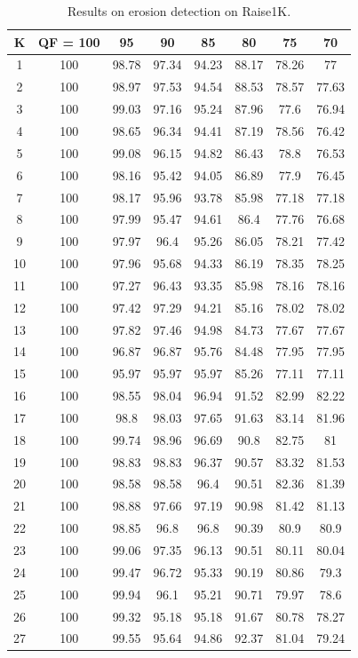\documentclass[review]{elsarticle}
\begin{document}
		
	\begin{longtable}{c|ccccccc}
		\caption{Results on erosion detection on Raise1K.}
		\label{table:raise}\\
		\hline\hline
		\textbf{K}&\textbf{QF = 100}&\textbf{95}&\textbf{90}&\textbf{85}&\textbf{80}&\textbf{75}&\textbf{70}\\
		\hline
		1&100&98.78&97.34&94.23&88.17&78.26&77\\
		2&100&98.97&97.53&94.54&88.53&78.57&77.63\\
		3&100&99.03&97.16&95.24&87.96&77.6&76.94\\
		4&100&98.65&96.34&94.41&87.19&78.56&76.42\\
		5&100&99.08&96.15&94.82&86.43&78.8&76.53\\
		6&100&98.16&95.42&94.05&86.89&77.9&76.45\\
		7&100&98.17&95.96&93.78&85.98&77.18&77.18\\
		8&100&97.99&95.47&94.61&86.4&77.76&76.68\\
		9&100&97.97&96.4&95.26&86.05&78.21&77.42\\
		10&100&97.96&95.68&94.33&86.19&78.35&78.25\\
		11&100&97.27&96.43&93.35&85.98&78.16&78.16\\
		12&100&97.42&97.29&94.21&85.16&78.02&78.02\\
		13&100&97.82&97.46&94.98&84.73&77.67&77.67\\
		14&100&96.87&96.87&95.76&84.48&77.95&77.95\\
		15&100&95.97&95.97&95.97&85.26&77.11&77.11\\
		16&100&98.55&98.04&96.94&91.52&82.99&82.22\\
		17&100&98.8&98.03&97.65&91.63&83.14&81.96\\
		18&100&99.74&98.96&96.69&90.8&82.75&81\\
		19&100&98.83&98.83&96.37&90.57&83.32&81.53\\
		20&100&98.58&98.58&96.4&90.51&82.36&81.39\\
		21&100&98.88&97.66&97.19&90.98&81.42&81.13\\
		22&100&98.85&96.8&96.8&90.39&80.9&80.9\\
		23&100&99.06&97.35&96.13&90.51&80.11&80.04\\
		24&100&99.47&96.72&95.33&90.19&80.86&79.3\\
		25&100&99.94&96.1&95.21&90.71&79.97&78.6\\
		26&100&99.32&95.18&95.18&91.67&80.78&78.27\\
		27&100&99.55&95.64&94.86&92.37&81.04&79.24\\

\end{longtable}
\end{document}
